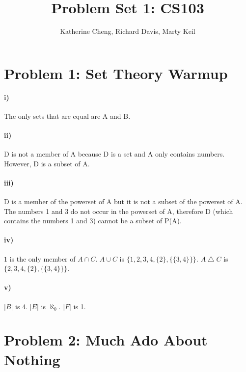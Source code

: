 \documentclass[10pt,letter]{article}
\begin{document}

\title{Problem Set 1: CS103}

\author{Katherine Cheng, Richard Davis, Marty Keil}

 
\maketitle 


\section*{Problem 1: Set Theory Warmup}

\paragraph{i)} The only sets that are equal are A and B.

\paragraph{ii)} D is not a member of A because D is a set and A only contains numbers. However, D is a subset of A.

\paragraph{iii)} D is a member of the powerset of A but it is not a subset of the powerset of A. The numbers 1 and 3 do not occur in the powerset of A, therefore D (which contains the numbers 1 and 3) cannot be a subset of P(A).

\paragraph{iv)} ${1}$ is the only member of $A \cap C$. $A \cup C$ is $\{1, 2, 3, 4, \{2\}, \{\{3, 4\}\}\}$. $A \bigtriangleup C$ is $\{2, 3, 4, \{2\}, \{\{3, 4\}\}\}$.

\paragraph{v)} $|B|$ is 4. $|E|$ is $\aleph_0$. $|F|$ is 1.

\section*{Problem 2: Much Ado About Nothing}
\end{document}
